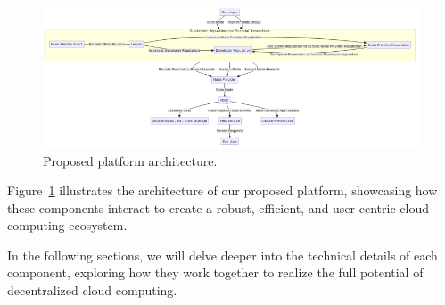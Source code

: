 \begin{figure}[h]
    \centering
    \includegraphics[width=\textwidth]{figures/proposed_architecture.png}
    \caption{Proposed platform architecture.}
    \label{fig:proposed-architecture}
\end{figure}

Figure~\ref{fig:proposed-architecture} illustrates the architecture of our proposed platform, showcasing how these components interact to create a robust, efficient, and user-centric cloud computing ecosystem.

In the following sections, we will delve deeper into the technical details of each component, exploring how they work together to realize the full potential of decentralized cloud computing.
